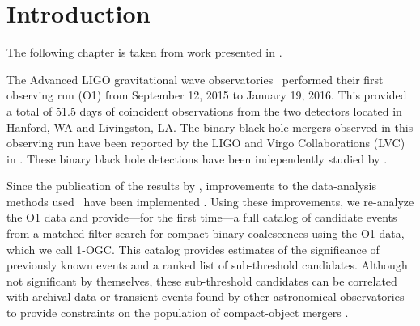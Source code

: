 \newcommand{\note}[1]{{\color{red} [#1]}}
\def\cn{\note{cite}}

\newcommand{\chieff}{\ensuremath{\chi_{\mathrm{eff}}}}
\newcommand{\rankingstat}{\ensuremath{\tilde{\rho}_c}}
\newcommand{\tdr}{\ensuremath{\mathrm{TDR}}}
\newcommand{\far}{\ensuremath{\mathcal{F}}}
\newcommand{\tar}{\ensuremath{\mathcal{T}}}
\newcommand{\msun}{\ensuremath{\mathrm{M}_{\odot}}}
\newcommand{\pastro}{\ensuremath{P_{\mathrm{astro}}}}
\newcommand{\release}{\texttt{\url{www.github.com/gwastro/1-ogc}}}

\section{Introduction}
\label{sec:intro}
The following chapter is taken from work presented in \cite{nitz20191}.

The Advanced LIGO gravitational wave observatories~\citep{Martynov:2016fzi} performed their first observing run (O1) from September 12, 2015 to January 19, 2016. This provided a total of 51.5 days of coincident observations from the two detectors located in Hanford, WA and Livingston, LA. The binary black hole mergers observed in this observing run have been  reported by the LIGO and Virgo Collaborations (LVC) in \cite{Abbott:2016blz,Abbott:2016nmj,TheLIGOScientific:2016pea}.  These binary black hole detections have been independently studied by \cite{Green:2017voq,Roulet:2018jbe,Antelis:2018smo}.

Since the publication of the results by \cite{TheLIGOScientific:2016pea,Abbott:2016ymx}, improvements to the data-analysis methods used~\citep{TheLIGOScientific:2016qqj} have been implemented \citep{Nitz:2017svb,Nitz:2017lco,DalCanton:2017ala}.  Using these improvements, we re-analyze the O1 data and provide---for the first time---a full catalog of candidate events from a matched filter search for compact binary coalescences using the O1 data, which we call 1-OGC. This catalog provides estimates of the significance of previously known events and a ranked list of sub-threshold candidates. Although not significant by themselves, these sub-threshold candidates can be correlated with archival data or transient events found by other astronomical observatories to provide constraints on the population of compact-object mergers \citep{Ashton:2017ykh, Burns:2018pcl}.

